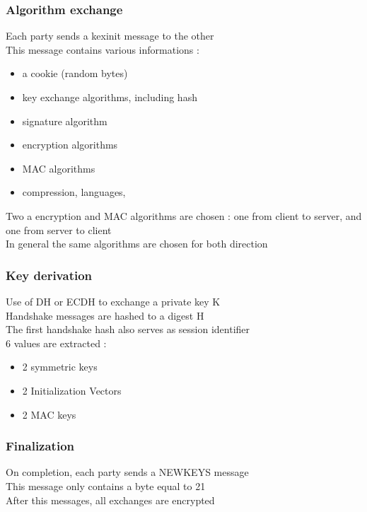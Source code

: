 \documentclass{beamer}
\begin{document}
\begin{frame}
\frametitle{Algorithm exchange}
Each party sends a kexinit message to the other\\
This message contains various informations :

\begin{itemize}
\item a cookie (random bytes)
\item key exchange algorithms, including hash
\item signature algorithm
\item encryption algorithms
\item MAC algorithms
\item compression, languages,

\end{itemize}

Two a encryption and MAC algorithms are chosen : one from client to server, and one from server to client\\
In general the same algorithms are chosen for both direction

\end{frame} 
      


\begin{frame}
\frametitle{Key derivation}


Use of DH or ECDH to exchange a private key K\\
Handshake messages are hashed to a digest H\\
The first handshake hash also serves as session identifier\\

\vspace{8mm}
6 values are extracted :
\begin{itemize}
\item 2 symmetric keys
\item 2 Initialization Vectors
\item 2 MAC keys
\end{itemize}

\end{frame}


\begin{frame}
\frametitle{Finalization}
On completion, each party sends a NEWKEYS message\\
This message only contains a byte equal to 21\\

\vspace{8mm}
After this messages, all exchanges are encrypted

\end{frame}
\end{document}
